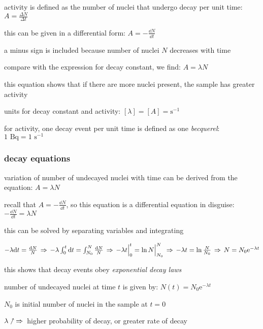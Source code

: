 activity is defined as the number of nuclei that undergo decay per unit time: $\boxed{A=\frac{\Delta N}{\Delta t}}$

this can be given in a differential form: $A = - \frac{\dd N}{\dd t}$

a minus sign is included because number of nuclei $N$ decreases with time

\cmt compare with the expression for decay constant, we find: $\boxed{A=\lambda N}$

this equation shows that if there are more nuclei present, the sample has greater activity

\cmt units for decay constant and activity: $[\lambda] = [A] = \text{s}^{-1}$

for activity, one decay event per unit time is defined as one \emph{becquerel}: $1 \text{ Bq} = 1 \text{ s}^{-1}$



\subsubsection{decay equations}

variation of number of undecayed nuclei with time can be derived from the equation: $A=\lambda N$

recall that $A = - \frac{\dd N}{\dd t}$, so this equation is a differential equation in disguise: $- \frac{\dd N}{\dd t} = \lambda N$

this can be solved by separating variables and integrating

{

\centering

$- \lambda \mathrm{d} t = \frac{\mathrm{d} N}{N} \, \Rightarrow \,
- \lambda \int_0^t \mathrm{d} t = \int_{N_0}^{N} \frac{\mathrm{d} N}{N} \, \Rightarrow \,
- \lambda t \Big|_{0}^{t}= \ln N \Big|_{N_0}^{N} \, \Rightarrow \,
- \lambda t = \ln \frac{N}{N_0} \, \Rightarrow \,
N = N_0 \mathrm{e}^{- \lambda t}$

}

this shows that decay events obey \emph{exponential decay laws}

\cmt number of undecayed nuclei at time $t$ is given by: $\boxed{N(t)=N_0 \mathrm{e}^{- \lambda t}}$

$N_0$ is initial number of nuclei in the sample at $t=0$

\cmt $\lambda \nnearrow \, \Rightarrow \,$ higher probability of decay, or greater rate of decay

